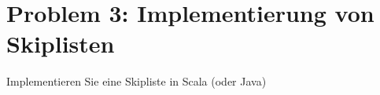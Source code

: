 \section*{{Problem 3: Implementierung von Skiplisten}} 

Implementieren Sie eine Skipliste in Scala (oder Java)



 







